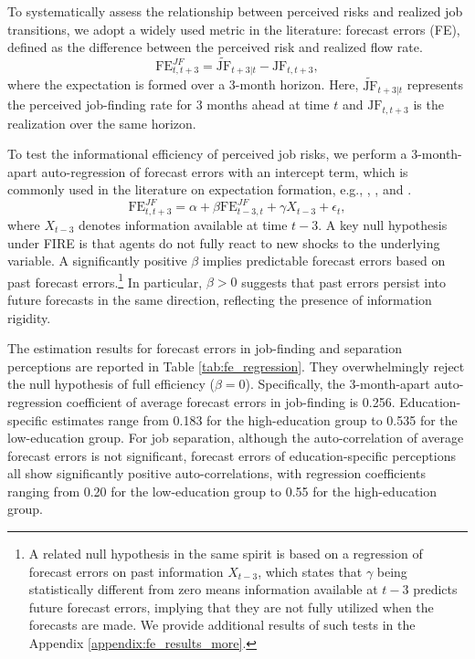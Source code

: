 To systematically assess the relationship between perceived risks and realized job transitions, we adopt a widely used metric in the literature: forecast errors (FE), defined as the difference between the perceived risk and realized flow rate. 
\begin{equation}
\text{FE}^{JF}_{t,t+3} = \widetilde{\text{JF}}_{t+3|t} - \text{JF}_{t,t+3}  ,
\end{equation}
where the expectation is formed over a 3-month horizon. Here, $\widetilde{\text{JF}}_{t+3|t}$ represents the perceived job-finding rate for 3 months ahead at time $t$ and $\text{JF}_{t,t+3}$ is the realization over the same horizon.

To test the informational efficiency of perceived job risks, we perform a 3-month-apart auto-regression of forecast errors with an intercept term, which is commonly used in the literature on expectation formation, e.g., \cite{coibion2015information}, \cite{fuhrer2018intrinsic}, and \cite{coibion2018firms}.
\begin{equation}
\label{eq:forecast_error_autoreg}
\text{FE}^{JF}_{t,t+3} = \alpha + \beta \text{FE}^{JF}_{t-3,t} + \gamma X_{t-3} +\epsilon_t ,
\end{equation}
where $X_{t-3}$ denotes information available at time $t-3$. A key null hypothesis under FIRE is that agents do not fully react to new shocks to the underlying variable. A significantly positive $\beta$ implies predictable forecast errors based on past forecast errors.\footnote{A related null hypothesis in the same spirit is based on a regression of forecast errors on past information $X_{t-3}$, which states that $\gamma$ being statistically different from zero means information available at $t-3$ predicts future forecast errors, implying that they are not fully utilized when the forecasts are made. We provide additional results of such tests in the Appendix \ref{appendix:fe_results_more}.} In particular, $\beta>0$ suggests that past errors persist into future forecasts in the same direction, reflecting the presence of information rigidity. 



The estimation results for forecast errors in job-finding and separation perceptions are reported in Table \ref{tab:fe_regression}. They overwhelmingly reject the null hypothesis of full efficiency ($\beta=0$). Specifically, the 3-month-apart auto-regression coefficient of average forecast errors in job-finding is 0.256. Education-specific estimates range from 0.183 for the high-education group to 0.535 for the low-education group. For job separation, although the auto-correlation of average forecast errors is not significant, forecast errors of education-specific perceptions all show significantly positive auto-correlations, with regression coefficients ranging from 0.20 for the low-education group to 0.55 for the high-education group. 

